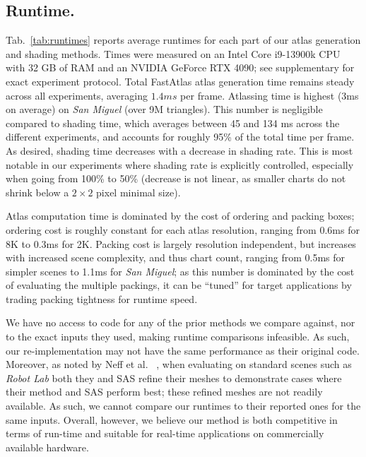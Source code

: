 
\subsection{Runtime.} 
Tab.~\ref{tab:runtimes} reports average runtimes for each part of our atlas generation and shading methods. Times were measured on an Intel Core i9-13900k CPU with 32 GB of RAM and an NVIDIA GeForce RTX 4090; see supplementary for exact experiment protocol. Total FastAtlas atlas generation time remains steady across all experiments, averaging $1.4ms$ per frame. Atlassing time is highest (3ms on average) on {\em San Miguel} (over 9M triangles). This number is negligible compared to shading time, which averages between 45 and 134 ms across the different experiments, and accounts for roughly 95\% of the total time per frame. As desired, shading time decreases with a decrease in shading rate. This is most notable in our experiments where shading rate is explicitly controlled, especially when going from 100\% to 50\% (decrease is not linear, as smaller charts do not shrink below a $2 \times 2$ pixel minimal size). 

Atlas computation time is dominated by the cost of ordering and packing boxes; ordering cost is roughly constant for each atlas resolution, ranging from 0.6ms for 8K to 0.3ms for 2K. Packing cost is largely resolution independent, but increases with increased scene complexity, and thus chart count, ranging from 0.5ms for simpler scenes to 1.1ms for {\em San Miguel}; as this number is dominated by the cost of evaluating the multiple packings, it can be ``tuned'' for target applications by trading packing tightness for runtime speed. 

We have no access to code for any of the prior methods we compare against, nor to the exact inputs they used, making runtime comparisons infeasible. As such, our re-implementation may not have the same performance as their original code. Moreover, as noted by Neff et al. ~, when evaluating on standard scenes such as {\em Robot Lab} both they and SAS refine their meshes to demonstrate cases where their method and SAS perform best; these refined meshes are not readily available. 
As such, we cannot compare our runtimes to their reported ones for the same inputs. Overall, however, we believe our method is both competitive in terms of run-time and suitable for real-time applications on commercially available hardware. 

